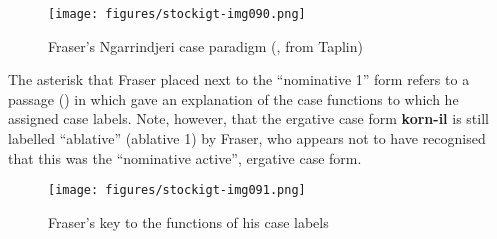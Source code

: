 \begin{figure}
\texttt{[image: figures/stockigt-img090.png]}
\caption{Fraser’s Ngarrindjeri case paradigm (\citeyear[30]{fraser_australian_1892}, from Taplin)}
\label{bkm:Ref456016861}\label{bkm:Ref336432860}\label{fig:key:7-144}
\end{figure}

\largerpage[2]
The asterisk that Fraser placed next to the “nominative 1” form refers to a passage () in which \citet[15]{fraser_australian_1892} gave an explanation of the case functions to which he assigned case labels. Note, however, that the ergative case form \textbf{korn-il} is still labelled “ablative” (ablative 1) by Fraser, who appears not to have recognised that this was the “nominative active'', ergative case form.


\begin{figure}
\texttt{[image: figures/stockigt-img091.png]}
\caption{Fraser’s key to the functions of his case labels \citeyearpar[15]{fraser_australian_1892}}
\label{bkm:Ref456016832}\label{fig:key:7-145}
\end{figure}

